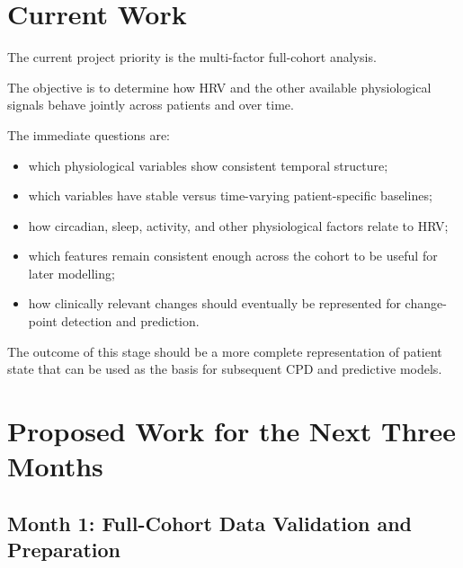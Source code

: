 \documentclass[11pt,a4paper]{article}
\begin{document}
\section{Current Work}

The current project priority is the multi-factor full-cohort analysis.

The objective is to determine how HRV and the other available physiological
signals behave jointly across patients and over time.

The immediate questions are:

\begin{itemize}[leftmargin=1.5em]

    \item which physiological variables show consistent temporal structure;

    \item which variables have stable versus time-varying patient-specific
    baselines;

    \item how circadian, sleep, activity, and other physiological factors relate
    to HRV;

    \item which features remain consistent enough across the cohort to be useful
    for later modelling;

    \item how clinically relevant changes should eventually be represented for
    change-point detection and prediction.

\end{itemize}

The outcome of this stage should be a more complete representation of patient
state that can be used as the basis for subsequent CPD and predictive models.

\section{Proposed Work for the Next Three Months}

\subsection{Month 1: Full-Cohort Data Validation and Preparation}
\end{document}
